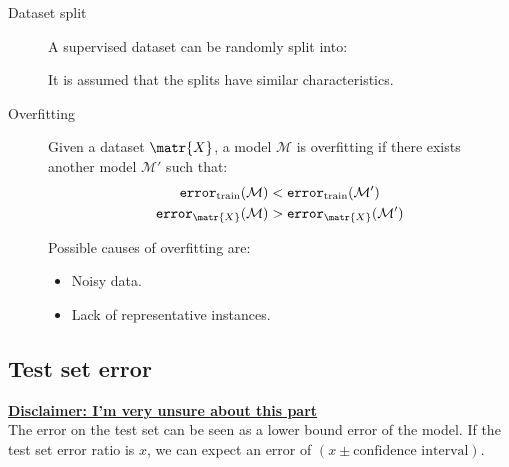 \begin{description}
    \item[Dataset split]
        A supervised dataset can be randomly split into:
        It is assumed that the splits have similar characteristics.

    \item[Overfitting] 
        Given a dataset $\matr{X}$, a model $\mathcal{M}$ is overfitting if
        there exists another model $\mathcal{M}'$ such that:
        \[ 
            \begin{split}
                \texttt{error}_\text{train}(\mathcal{M}) &< \texttt{error}_\text{train}(\mathcal{M}') \\
                \texttt{error}_\matr{X}(\mathcal{M}) &> \texttt{error}_\matr{X}(\mathcal{M}') \\
            \end{split}    
        \]

        Possible causes of overfitting are:
        \begin{itemize}
            \item Noisy data.
            \item Lack of representative instances.
        \end{itemize}
\end{description}


\subsection{Test set error}
\textbf{\underline{Disclaimer: I'm very unsure about this part}}\\
The error on the test set can be seen as a lower bound error of the model.
If the test set error ratio is $x$, we can expect an error of $(x \pm  \text{confidence interval})$.

